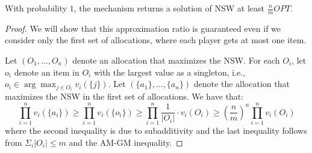 \documentclass{article}
\begin{document}
\begin{lemma}\label{algs-approx-mn}
With probability $1$, the mechanism returns a solution of NSW at least $\frac{n}{m} OPT$.
\end{lemma}
\begin{proof}
We will show that this approximation ratio is guaranteed even if we consider only the first set of allocations, where each player gets at most one item. 

Let $(O_1,\ldots, O_n)$ denote an allocation that maximizes the NSW. For each $O_i$, let $o_i$ denote an item in $O_i$ with the largest value as a singleton, i.e., $o_i\in \arg\max_{j\in O_i}v_i(\{j\})$. Let $(\{a_1\},\ldots, \{a_n\})$ denote the allocation that maximizes the NSW in the first set of allocations. We have that:
$$
\prod_{i=1}^{n} v_i(\{a_i\}) \geq \prod_{i=1}^{n}  v_i(\{o_i\}) \geq \prod_{i=1}^{n}  \frac {1} {|O_i|} \cdot v_i(O_i) \geq \left(\frac n m \right)^n \prod_{i=1}^{n}   v_i(O_i)
$$
where the second inequality is due to subadditivity and the last inequality follows from $\Sigma_i|O_i|\leq m$ and the AM-GM inequality.
\end{proof}
\end{document}
